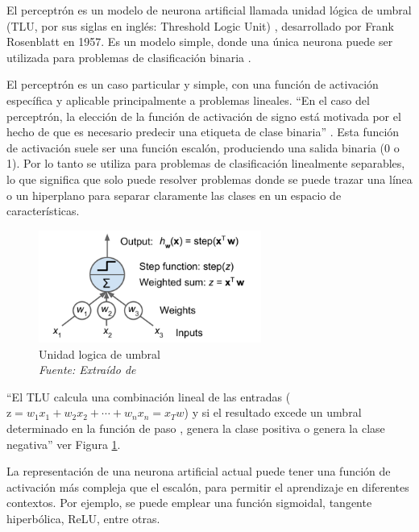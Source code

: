 El perceptrón es un modelo de neurona artificial llamada unidad lógica de umbral (TLU, por sus siglas en inglés: Threshold Logic Unit) , desarrollado por Frank Rosenblatt en 1957. Es un modelo simple, donde una única neurona puede ser utilizada para problemas de clasificación binaria \cite{rosenblatt1957perceptron}.

El perceptrón es un caso particular y simple, con una función de activación específica y aplicable principalmente a problemas lineales. “En el caso del perceptrón, la elección de la función de activación de signo está motivada por el hecho de que es necesario predecir una etiqueta de clase binaria” \cite[p. 11]{aggarwal2018neural}. Esta función de activación suele ser una función escalón, produciendo una salida binaria (0 o 1).  Por lo tanto se utiliza para problemas de clasificación linealmente separables, lo que significa que solo puede resolver problemas donde se puede trazar una línea o un hiperplano para separar claramente las clases en un espacio de características.

\begin{figure}[h!]
	
	\includegraphics[width=0.65\textwidth]{capitulo2/figuras/an4.png}
	\caption[Unidad logica de umbral]{Unidad logica de umbral
		\\\textit{Fuente: Extraído de} \protect\cite[p. 282]{geron2019hands}}
	\label{fig:an4}
\end{figure}

``El TLU calcula una combinación lineal de las entradas ( $\text{z} = w_1x_1 + w_2x_2 + \cdots + w_nx_n = x_Tw$) y si el resultado excede un umbral determinado en la función de paso , genera la clase positiva o genera la clase negativa''\cite[p. 282]{geron2019hands} ver Figura \ref{fig:an4}. 

La representación de una neurona artificial actual puede tener una función de activación más compleja que el escalón,  para permitir el aprendizaje en diferentes contextos. Por ejemplo, se puede emplear una función sigmoidal, tangente hiperbólica, ReLU, entre otras.






